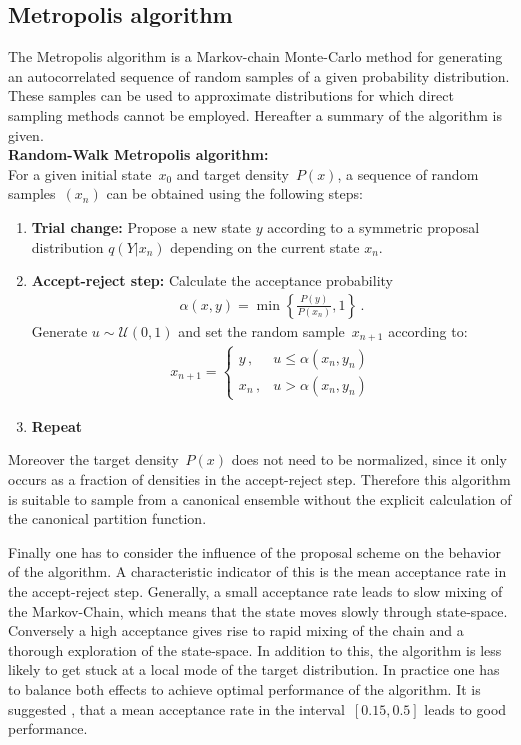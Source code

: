 \documentclass[11pt, a4paper]{article}
\numberwithin{equation}{section}
\begin{document}
\subsection{Metropolis algorithm} \label{sec:Metropolis}
The Metropolis algorithm is a Markov-chain Monte-Carlo method for generating an autocorrelated sequence of random samples of a given probability distribution.
These samples can be used to approximate distributions for which direct sampling methods cannot be employed.
Hereafter a summary of the algorithm is given.\\

\noindent\textbf{Random-Walk Metropolis algorithm:}\\
For a given initial state~$x_0$ and target density~$P(x)$, a sequence of random samples~$\left( x_n \right)$ can be obtained using the following steps:
\begin{enumerate}
	\item \textbf{Trial change:}
		Propose a new state $y$ according to a symmetric proposal distribution $q(Y|x_n)$ depending on the current state $x_n$.
		
	\item \textbf{Accept-reject step:}
		Calculate the acceptance probability
		\begin{align}
			\alpha(x, y) = \min\left\{ \frac{P(y)}{P(x_n)}, 1\right\} \,\text{.}
			\label{eq:acceptance_probability}
		\end{align}
		Generate $u \sim \mathcal{U}(0, 1)$ and set the random sample~$x_{n+1}$ according to:
		\begin{align*}
			x_{n+1} = \begin{cases}
					y \,, & u \leq \alpha(x_n, y_n) \\
					x_n \,, & u > \alpha(x_n, y_n)
				\end{cases}
		\end{align*}
		
	\item \textbf{Repeat}
\end{enumerate}
Moreover the target density~$P(x)$ does not need to be normalized, since it only occurs as a fraction of densities in the accept-reject step.
Therefore this algorithm is suitable to sample from a canonical ensemble without the explicit calculation of the canonical partition function.

Finally one has to consider the influence of the proposal scheme on the behavior of the algorithm.
A characteristic indicator of this is the mean acceptance rate in the accept-reject step.
Generally, a small acceptance rate leads to slow mixing of the Markov-Chain, which means that the state moves slowly through state-space.
Conversely a high acceptance gives rise to rapid mixing of the chain and a thorough exploration of the state-space.
In addition to this, the algorithm is less likely to get stuck at a local mode of the target distribution.
In practice one has to balance both effects to achieve optimal performance of the algorithm.
It is suggested \cite{gilks_richardson}, that a mean acceptance rate in the interval~$[0.15, 0.5]$ leads to good performance.
\end{document}

